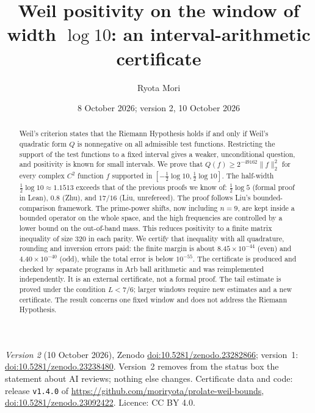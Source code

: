 \documentclass[11pt]{amsart}
\title[Weil positivity on the window of width $\log 10$]{Weil positivity on the window of width $\log 10$: an interval-arithmetic certificate}
\author{Ryota Mori}
\date{8 October 2026; version 2, 10 October 2026}
\newcommand{\doi}[1]{\href{https://doi.org/#1}{doi:#1}}
\theoremstyle{remark}
\numberwithin{equation}{section}
\begin{document}
\begin{abstract}
Weil's criterion states that the Riemann Hypothesis holds if and only if Weil's quadratic form $Q$ is nonnegative on all admissible test functions. Restricting the support of the test functions to a fixed interval gives a weaker, unconditional question, and positivity is known for small intervals. We prove that $Q(f)\ge2^{-49162}\|f\|_2^2$ for every complex $C^2$ function $f$ supported in $[-\tfrac12\log10,\tfrac12\log10]$. The half-width $\tfrac12\log10\approx1.1513$ exceeds that of the previous proofs we know of: $\tfrac12\log5$ (formal proof in Lean), $0.8$ (Zhu), and $17/16$ (Liu, unrefereed). The proof follows Liu's bounded-comparison framework. The prime-power shifts, now including $n=9$, are kept inside a bounded operator on the whole space, and the high frequencies are controlled by a lower bound on the out-of-band mass. This reduces positivity to a finite matrix inequality of size $320$ in each parity. We certify that inequality with all quadrature, rounding and inversion errors paid: the finite margin is about $8.45\times10^{-44}$ (even) and $4.40\times10^{-40}$ (odd), while the total error is below $10^{-55}$. The certificate is produced and checked by separate programs in Arb ball arithmetic and was reimplemented independently. It is an external certificate, not a formal proof. The tail estimate is proved under the condition $L<7/6$; larger windows require new estimates and a new certificate. The result concerns one fixed window and does not address the Riemann Hypothesis.
\end{abstract}

\maketitle

\begin{sloppypar}
\noindent\textit{Version 2} (10 October 2026), Zenodo \doi{10.5281/zenodo.23282866}; version~1: \doi{10.5281/zenodo.23238480}. Version~2 removes from the status box the statement about AI reviews; nothing else changes. Certificate data and code: release \texttt{v1.4.0} of \url{https://github.com/moriryota/prolate-weil-bounds}, \doi{10.5281/zenodo.23092422}. Licence: CC BY 4.0.
\end{sloppypar}

\begin{center}
\end{center}
\end{document}
